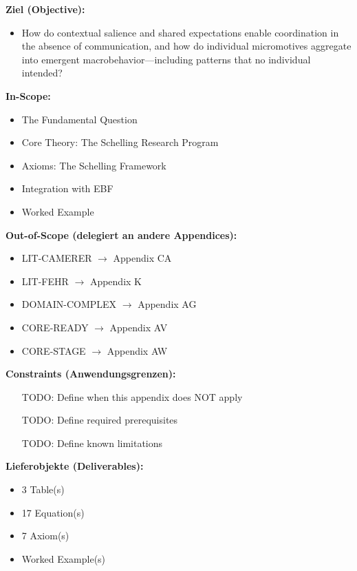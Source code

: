 \begin{tcolorbox}[
    colback=orange!5!white,
    colframe=orange!75!black,
    title={\textbf{Appendix Scope: Ziel / In-Scope / Out-of-Scope / Constraints}},
    fonttitle=\bfseries
]

\textbf{Ziel (Objective):}
\begin{itemize}[nosep]
    \item How do contextual salience and shared expectations enable coordination
in the absence of communication, and how do individual micromotives aggregate
into emergent macrobehavior---including patterns that no individual intended?
\end{itemize}

\textbf{In-Scope:}
\begin{itemize}[nosep]
    \item The Fundamental Question
    \item Core Theory: The Schelling Research Program
    \item Axioms: The Schelling Framework
    \item Integration with EBF
    \item Worked Example
\end{itemize}

\textbf{Out-of-Scope (delegiert an andere Appendices):}
\begin{itemize}[nosep]
    \item LIT-CAMERER $\rightarrow$ Appendix CA
    \item LIT-FEHR $\rightarrow$ Appendix K
    \item DOMAIN-COMPLEX $\rightarrow$ Appendix AG
    \item CORE-READY $\rightarrow$ Appendix AV
    \item CORE-STAGE $\rightarrow$ Appendix AW
\end{itemize}

\textbf{Constraints (Anwendungsgrenzen):}
\begin{itemize}[nosep]
    \item [TODO: Define when this appendix does NOT apply]
    \item [TODO: Define required prerequisites]
    \item [TODO: Define known limitations]
\end{itemize}

\textbf{Lieferobjekte (Deliverables):}
\begin{itemize}[nosep]
    \item 3 Table(s)
    \item 17 Equation(s)
    \item 7 Axiom(s)
    \item Worked Example(s)
\end{itemize}

\end{tcolorbox}




